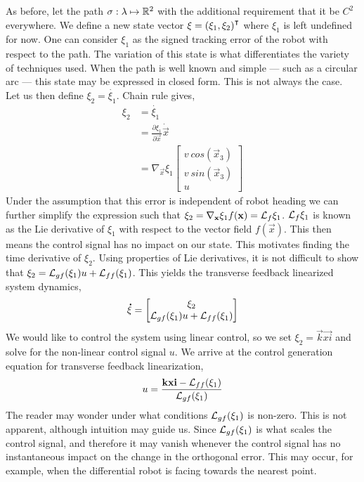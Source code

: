 \documentclass[oneside, 11pt]{book}
\begin{document}
As before, let the path $\sigma:\lambda\mapsto\mathbb{R}^2$ with the additional requirement that it be $C^2$ everywhere. We define a new state vector $\mathbf{\xi}={(\xi_1, \xi_2)}^{\intercal}$ where $\xi_1$ is left undefined for now. One can consider $\xi_1$ as the signed tracking error of the robot with respect to the path. The variation of this state is what differentiates the variety of techniques used. When the path is well known and simple --- such as a circular arc --- this state may be expressed in closed form. This is not always the case. Let us then define $\xi_2=\dot{\xi_1}$. Chain rule gives,
\begin{align*}
    \xi_2   &= \dot{\xi_1}\\
            &= \frac{\partial\xi_1}{\partial\vec{x}}\dot{\vec{x}}\\
            &= \nabla_{\vec{x}}\xi_1
                \begin{bmatrix}
                    v~cos(\vec{x}_3)\\
                    v~sin(\vec{x}_3)\\
                    u
                \end{bmatrix}
\end{align*}
Under the assumption that this error is independent of robot heading we can further simplify the expression such that $\xi_2=\nabla_{\mathbf{x}}\xi_1 f(\mathbf{x})=\mathcal{L}_{f}\xi_1$. $\mathcal{L}_{f}\xi_1$ is known as the Lie derivative of $\xi_1$ with respect to the vector field $f(\vec{x})$. This then means the control signal has no impact on our state. This motivates finding the time derivative of $\xi_2$. Using properties of Lie derivatives, it is not difficult to show that $\xi_2=\mathcal{L}_{gf}(\xi_1) u + \mathcal{L}_{ff}(\xi_1)$. This yields the transverse feedback linearized system dynamics,
\begin{equation}
    \mathbf{\dot{\xi}}
    =
    \begin{bmatrix} \xi_2 \\ \mathcal{L}_{gf}(\xi_1) u + \mathcal{L}_{ff}(\xi_1) \end{bmatrix}
    \label{eqn:tfl_dynamics}
\end{equation}
We would like to control the system using linear control, so we set $\xi_2=\vec{k}\vec{xi}$ and solve for the non-linear control signal $u$. We arrive at the control generation equation for transverse feedback linearization,
\begin{equation}
    u = \frac{\mathbf{k}\mathbf{xi} - \mathcal{L}_{ff}(\xi_1)}{\mathcal{L}_{gf}(\xi_1)}
\end{equation}
The reader may wonder under what conditions $\mathcal{L}_{gf}(\xi_1)$ is non-zero. This is not apparent, although intuition may guide us. Since $\mathcal{L}_{gf}(\xi_1)$ is what scales the control signal, and therefore it may vanish whenever the control signal has no instantaneous impact on the change in the orthogonal error. This may occur, for example, when the differential robot is facing towards the nearest point.
\end{document}
